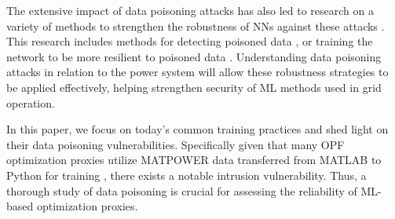 The extensive impact of data poisoning attacks has also led to research on a variety of methods to strengthen the robustness of NNs against these attacks \cite{CompSurvey}. This research includes methods for detecting poisoned data \cite{DetectPois}, or training the network to be more resilient to poisoned data \cite{inbook}. Understanding data poisoning attacks in relation to the power system will allow these robustness strategies to be applied effectively, helping strengthen security of ML methods used in grid operation.

In this paper, we focus on today's common training practices and shed light on their data poisoning vulnerabilities.
Specifically given that many OPF optimization proxies utilize MATPOWER data transferred from MATLAB to Python for training \cite{zhao2020deepopf, donti2021dc3, Li_2023}, there exists a notable intrusion vulnerability. 
Thus, a thorough study of data poisoning is crucial for assessing the reliability of ML-based optimization proxies.







